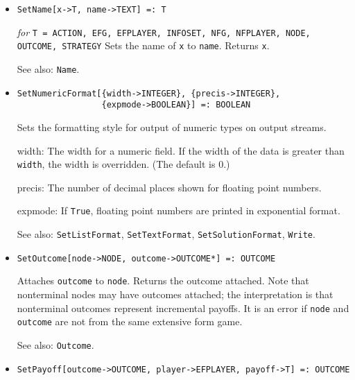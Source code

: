 \begin{itemize}
\item{}
\protect \large \begin{verbatim}
SetName[x->T, name->TEXT] =: T
\end{verbatim}\normalsize

{\it for} {\tt T = ACTION, EFG, EFPLAYER, INFOSET, NFG, NFPLAYER,
NODE, OUTCOME, STRATEGY}
\bd
Sets the name of \verb+x+ to \verb+name+.  Returns \verb+x+.
\item [See also:] \verb+Name+.
\ed

\item{}
\protect \large \begin{verbatim}
SetNumericFormat[{width->INTEGER}, {precis->INTEGER},
                 {expmode->BOOLEAN}] =: BOOLEAN
\end{verbatim}\normalsize

\bd
Sets the formatting style for output of numeric types on output streams.
\bd
\item [width:] The width for a numeric field.  If the width of the
data is greater than \verb+width+, the width is overridden.  (The
default is 0.)
\item [precis:] The number of decimal places shown for floating point
numbers.
\item [expmode:] If \verb+True+, floating point numbers are printed in
exponential format.
\ed
\item [See also:] \verb+SetListFormat+, \verb+SetTextFormat+, 
\verb+SetSolutionFormat+, \verb+Write+.
\ed

\item{}
\protect \large \begin{verbatim} 
SetOutcome[node->NODE, outcome->OUTCOME*] =: OUTCOME
\end{verbatim}\normalsize

\bd
Attaches \verb+outcome+ to \verb+node+.  Returns the outcome attached.
Note that nonterminal nodes may have outcomes attached; the interpretation
is that nonterminal outcomes represent incremental payoffs.  
It is an error if \verb+node+ and \verb+outcome+ are not from the same
extensive form game.
\item [See also:] \verb+Outcome+.
\ed

\item{}
\protect \large \begin{verbatim}
SetPayoff[outcome->OUTCOME, player->EFPLAYER, payoff->T] =: OUTCOME
\end{verbatim}\normalsize


\end{itemize}
